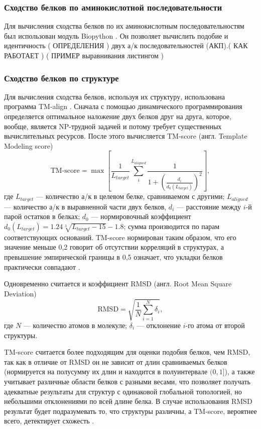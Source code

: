\documentclass[a4paper,14pt]{article}         %
\begin{document}
\subsubsection{Сходство белков по аминокислотной последовательности}
Для вычисления сходства белков по их аминокислотным последовательностям был использован модуль Biopython \cite{biopython}. Он позволяет вычислить подобие и идентичность (\color{orange} ОПРЕДЕЛЕНИЯ \color{black}) двух а/к последовательностей (АКП).(\color{orange} КАК РАБОТАЕТ \color{black}) (\color{orange} ПРИМЕР выравнивания листингом \color{black}) 

\subsubsection{Сходство белков по структуре}
Для вычисления сходства белков, используя их структуру, использована программа TM-align \cite{TM, TMalign}. 
Сначала с помощью динамического программирования определяется оптимальное наложение двух белков друг на друга, которое, вообще, является NP-трудной задачей \cite{Lathrop1994} 
и потому требует существенных вычислительных ресурсов. После этого вычисляется TM-score (англ. Template Modeling score)\cite{Levitt1998} 
\begin{equation}
\label{tm-score}
\text{TM-score} = \max\left[\frac{1}{L_{target}}\sum_i^{L_{aligned}}\frac{1}{1+\left(\frac{d_i}{d_0(L_{target})}\right)^2}\right],
\end{equation}
где $L_{target}$ --- количество а/к в целевом белке, сравниваемом с другими; $L_{aligned}$ --- количество а/к в выравненной части двух белков, $d_i$ --- расстояние между $i$-й парой остатков в белках; $d_0$ --- нормировочный коэффициент $d_0(L_{target}) = 1.24\sqrt[3]{L_{target}-15}-1.8$; сумма производится по парам соответствующих оснований. TM-score нормирован таким образом, что его значение меньше 0,2 говорит об отсутствии корреляций в структурах, а превышение эмпирической границы в 0,5 означает, что укладки белков практически совпадают \cite{TMalign}. 

Одновременно считается и коэффициент RMSD (англ. Root Mean Square Deviation) %
\begin{equation}
\label{rmsd}
\text{RMSD} = \sqrt{\frac{1}{N}\sum_{i=1}^N \delta_i},
\end{equation}
где $N$ --- количество атомов в молекуле; $\delta_i$ --- отклонение $i$-го атома от второй структуры.

TM-score считается более подходящим для оценки подобия белков, чем RMSD, так как в отличие от RMSD он не зависит от длин сравниваемых белков (нормируется на полусумму их длин и находится в полуинтервале $(0, 1]$), а также учитывает различные области белков с разными весами, что позволяет получать адекватные результаты для структур с одинаковой глобальной топологией, но небольшими отклонениями по всей длине белка. В случае использования RMSD результат будет подразумевать то, что структуры различны, а TM-score, вероятнее всего, детектирует схожесть \cite{TMalign}.
\end{document}
